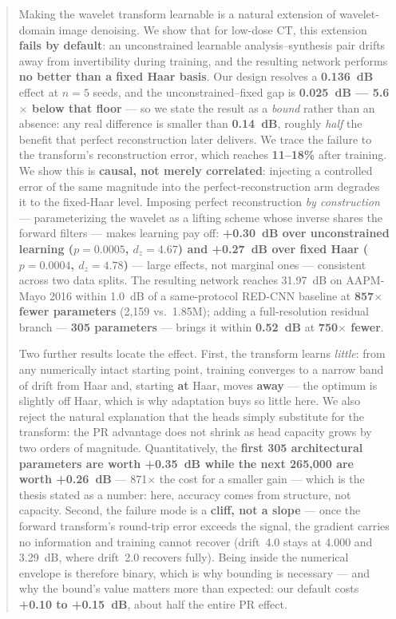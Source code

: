 \documentclass[conference]{IEEEtran}
\begin{document}
\begin{abstract}
Making the wavelet transform learnable is a natural extension of wavelet-domain
image denoising. We show that for low-dose CT, this extension \textbf{fails by
default}: an unconstrained learnable analysis--synthesis pair drifts away from
invertibility during training, and the resulting network performs \textbf{no
better than a fixed Haar basis}. Our design resolves a \textbf{0.136~dB} effect
at $n=5$ seeds, and the unconstrained--fixed gap is \textbf{0.025~dB ---
5.6$\times$ below that floor} --- so we state the result as a \emph{bound} rather
than an absence: any real difference is smaller than \textbf{0.14~dB}, roughly
\emph{half} the benefit that perfect reconstruction later delivers. We trace the
failure to the transform's reconstruction error, which reaches
\textbf{11--18\%} after training. We show this is \textbf{causal, not merely
correlated}: injecting a controlled error of the same magnitude into the
perfect-reconstruction arm degrades it to the fixed-Haar level. Imposing perfect
reconstruction \emph{by construction} --- parameterizing the wavelet as a lifting scheme whose inverse
shares the forward filters --- makes learning pay off: \textbf{+0.30~dB over
unconstrained learning ($p=0.0005$, $d_z=4.67$) and +0.27~dB over fixed Haar
($p=0.0004$, $d_z=4.78$)} --- large effects, not marginal ones --- consistent
across two data splits. The resulting network reaches 31.97~dB on AAPM-Mayo 2016
within 1.0~dB of a same-protocol RED-CNN baseline at \textbf{857$\times$ fewer
parameters} (2,159 vs.\ 1.85M); adding a full-resolution residual branch ---
\textbf{305 parameters} --- brings it within \textbf{0.52~dB} at \textbf{750$\times$
fewer}.

Two further results locate the effect. First, the transform learns \emph{little}:
from any numerically intact starting point, training converges to a narrow band
of drift from Haar and, starting \textbf{at} Haar, moves \textbf{away} --- the
optimum is slightly off Haar, which is why adaptation buys so little here. We
also reject the natural explanation that the heads simply substitute for the
transform: the PR advantage does not shrink as head capacity grows by two orders
of magnitude. Quantitatively, the \textbf{first 305 architectural parameters are
worth +0.35~dB while the next 265,000 are worth +0.26~dB} --- 871$\times$ the cost
for a smaller gain --- which is the thesis stated as a number: here, accuracy
comes from structure, not capacity. Second, the failure mode is a \textbf{cliff, not a slope} --- once
the forward transform's round-trip error exceeds the signal, the gradient carries
no information and training cannot recover (drift~4.0 stays at 4.000 and
3.29~dB, where drift~2.0 recovers fully). Being inside the numerical envelope is
therefore binary, which is why bounding is necessary --- and why the bound's
value matters more than expected: our default costs \textbf{+0.10 to +0.15~dB},
about half the entire PR effect.
\end{abstract}
\end{document}
